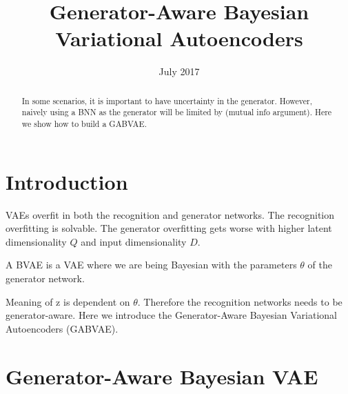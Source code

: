 \documentclass{article}
\title{Generator-Aware Bayesian Variational Autoencoders}
\author{}
\date{July 2017}
\begin{document}
\maketitle

\begin{abstract}
In some scenarios, it is important to have uncertainty in the generator. However, naively using a BNN as the generator will be limited by (mutual info argument). Here we show how to build a GABVAE. 
\end{abstract}



\section{Introduction}

VAEs \cite{vae} overfit in both the recognition and generator networks. The recognition overfitting is solvable. The generator overfitting gets worse with higher latent dimensionality $Q$ and input dimensionality $D$. 

A BVAE is a VAE where we are being Bayesian with the parameters $\theta$ of the generator network. 

Meaning of z is dependent on $\theta$. Therefore the recognition networks needs to be generator-aware. Here we introduce the Generator-Aware Bayesian Variational Autoencoders (GABVAE).


\section{Generator-Aware Bayesian VAE}
\end{document}
